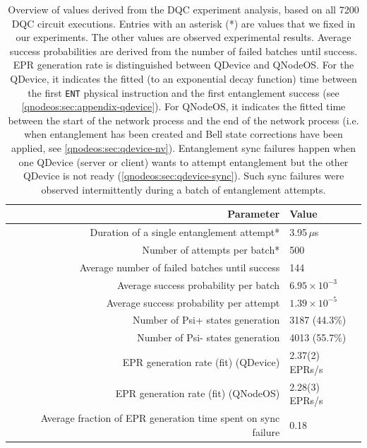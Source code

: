 \begin{table}[htpb]
    \centering
    \begin{tabular}{|r|l|}
    \hline
    \textbf{Parameter} & \textbf{Value} \\ 
    \hline
    Duration of a single entanglement attempt* & 3.95\,$\mu$s \\
    Number of attempts per batch* & 500 \\
    Average number of failed batches until success & 144 \\
    Average success probability per batch & $6.95 \times 10^{-3}$ \\
    Average success probability per attempt & $1.39 \times 10^{-5}$ \\
    Number of Psi+ states generation & 3187 (44.3\%) \\
    Number of Psi- states generation & 4013 (55.7\%) \\
    EPR generation rate (fit) (QDevice) & 2.37(2) EPRs/s \\
    EPR generation rate (fit) (QNodeOS) & 2.28(3) EPRs/s \\
    Average fraction of EPR generation time spent on sync failure & 0.18 \\
    
    \hline
    \end{tabular}
    \caption{Overview of values derived from the \ac{DQC} experiment analysis, based on all 7200 \ac{DQC} circuit executions. Entries with an asterisk (*) are values that we fixed in our experiments. The other values are observed experimental results. Average success probabilities are derived from the number of failed batches until success.
    \ac{EPR} generation rate is distinguished between \ac{QDevice} and \ac{QNodeOS}. For the \ac{QDevice}, it indicates the fitted (to an exponential decay function) time between the first \texttt{ENT} physical instruction and the first entanglement success (see \cref{qnodeos:sec:appendix-qdevice}). For \ac{QNodeOS}, it indicates the fitted time between the start of the network process and the end of the network process (i.e. when entanglement has been created and Bell state corrections have been applied, see \cref{qnodeos:sec:qdevice-nv}). Entanglement sync failures happen when one \ac{QDevice} (server or client) wants to attempt entanglement but the other \ac{QDevice} is not ready (\cref{qnodeos:sec:qdevice-sync}). Such sync failures were observed intermittently during a batch of entanglement attempts.}
    \label{tab:entanglement_stats}
\end{table}

